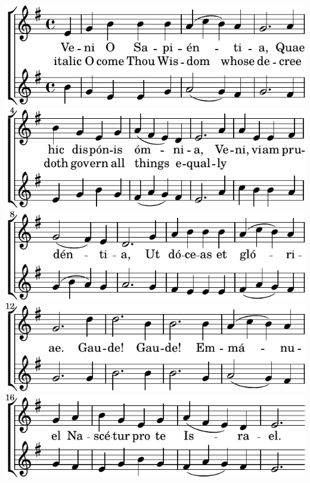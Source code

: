 \includegraphics{f6b7d81d4ddec49be9890a69cf9a3840-1}%
\ifx\betweenLilyPondSystem \undefined
  \linebreak
\else
  \expandafter{}%
\fi
\includegraphics{f6b7d81d4ddec49be9890a69cf9a3840-2}%
\ifx\betweenLilyPondSystem \undefined
  \linebreak
\else
  \expandafter{}%
\fi
\includegraphics{f6b7d81d4ddec49be9890a69cf9a3840-3}%
\ifx\betweenLilyPondSystem \undefined
  \linebreak
\else
  \expandafter{}%
\fi
\includegraphics{f6b7d81d4ddec49be9890a69cf9a3840-4}%
\ifx\betweenLilyPondSystem \undefined
  \linebreak
\else
  \expandafter{}%
\fi
\includegraphics{f6b7d81d4ddec49be9890a69cf9a3840-5}%
